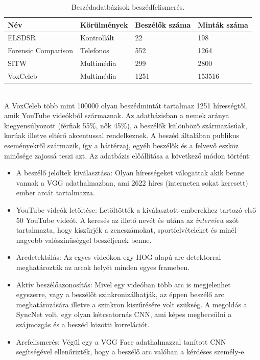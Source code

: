 \begin{table}[!ht]
	\begin{tabular}{*4l} \toprule
		\bfseries Név & \bfseries Körülmények & \bfseries Beszélők száma & \bfseries Minták száma \\ \midrule
		ELSDSR                             & Kontrollált & 22     & 198          \\
		\rowcolor{gray!10} 
		Forensic Comparison                & Telefonos   & 552   & 1264        \\
		SITW                           & Multimédia        & 299   & 2800        \\
		\rowcolor{gray!10} 
		VoxCeleb                           & Multimédia        & 1251   & 153516        \\
		\bottomrule
		\hline
	\end{tabular}
	\centering
	\caption{Beszédadatbázisok beszédfelismerés.}
	\label{fig:speaker-recognition-datasets}
\end{table}
\ \\
A VoxCeleb több mint 100000 olyan beszédmintát tartalmaz 1251 hírességtől, amik YouTube videókból származnak. Az adatbázisban a nemek aránya kiegyensúlyozott (férfiak 55\%, nők 45\%), a beszélők különböző származásúak, korúak illetve eltérő akcentussal rendelkeznek. A beszéd általában publikus eseményekről származik, így a háttérzaj, egyéb beszélők és a felvevő eszköz minősége zajossá teszi azt.
\newline
\newline
Az adatbázis előállítása a következő módon történt:
\begin{itemize}
	\item A beszélő jelöltek kiválasztása:  Olyan hírességeket válogattak akik benne vannak a VGG adathalmazban, ami 2622 híres (interneten sokat keresett) ember arcát tartalmazza.
	\item YouTube videók letöltése: Letöltötték a kiválasztott emberekhez tartozó első 50 YouTube videót. A keresés az illető nevét és utána az \emph{interview} szót tartalmazta, hogy kiszűrjék a zeneszámokat, sportfelvételeket és minél nagyobb valószínűséggel beszéljenek benne.
	\item Arcdetektálás: Az egyes videókon egy HOG-alapú arc detektorral meghatározták az arcok helyét minden egyes frameben.
	\item Aktív beszélőazonosítás: Mivel egy videóban több arc is megjelenhet egyszerre, vagy a beszélőt szinkronizálhatják, az éppen beszélő arc meghatározására illetve a szinkron kiszűrésére volt szükség. A megoldás a SyncNet volt, egy olyan kétcsatornás CNN, ami képes megbecsülni a szájmozgás és a beszéd közötti korrelációt.
	\item Arcfelismerés: Végül egy a VGG Face adathalmazzal tanított CNN segítségével ellenőrizték, hogy a beszélő arc valóban a kérdéses személy-e.
\end{itemize}

